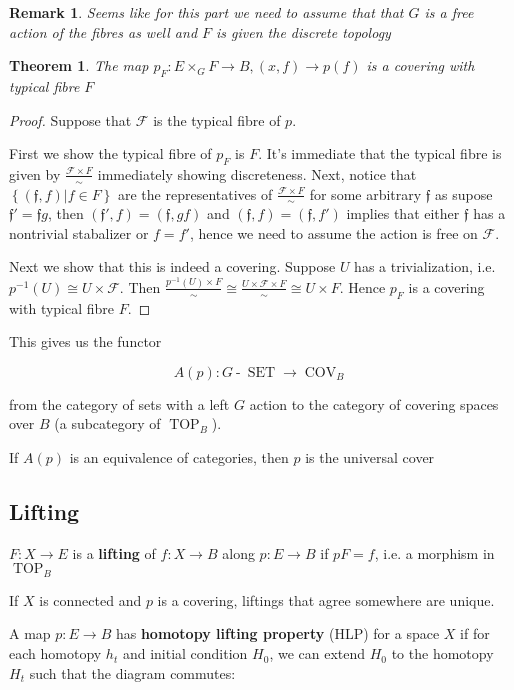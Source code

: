 \documentclass[12pt]{article}
\newtheorem*{thm*}{Theorem}
\newtheorem*{rmk}{Remark}
\newcommand{\mc}{\mathcal}
\newcommand{\mfk}{\mathfrak}
\DeclareMathOperator{\hyp}{-}
\DeclareMathOperator{\SET}{SET}
\DeclareMathOperator{\TOP}{TOP}
\DeclareMathOperator{\COV}{COV}
\begin{document}
\begin{rmk}
    Seems like for this part we need to assume that that $G$ is a free action of the fibres as well and $F$ is given the discrete topology
\end{rmk}

\begin{thm*}
    The map $p_F:E\times_GF\to B,(x,f)\to p(f)$ is a covering with typical fibre $F$
\end{thm*}

\begin{proof}
    Suppose that $\mc F$ is the typical fibre of $p$.

    First we show the typical fibre of $p_F$ is $F$. It's immediate that the typical fibre is given by $\frac{\mc F\times F}{\sim}$ immediately showing discreteness. Next, notice that $\left\{\left(\mfk f,f\right)|f\in F\right\}$ are the representatives of $\frac{\mc F\times F}{\sim}$ for some arbitrary $\mfk f$ as supose $\mfk f'=\mfk fg$, then $\left(\mfk f',f\right)=\left(\mfk f,gf\right)$ and $\left(\mfk f,f\right)=\left(\mfk f,f'\right)$ implies that either $\mfk f$ has a nontrivial stabalizer or $f=f'$, hence we need to assume the action is free on $\mc F$.

    Next we show that this is indeed a covering. Suppose $U$ has a trivialization, i.e. $p^{-1}(U)\cong U\times\mc F$. Then $\frac{p^{-1}(U)\times F}{\sim}\cong\frac{U\times\mc F\times F}{\sim}\cong U\times F$. Hence $p_F$ is a covering with typical fibre $F$.
\end{proof}

This gives us the functor

\[A(p):G\hyp\SET\to\COV_B\]

from the category of sets with a left $G$ action to the category of covering spaces over $B$ (a subcategory of $\TOP_B$).

If $A(p)$ is an equivalence of categories, then $p$ is the universal cover

\subsection{Lifting}

$F:X\to E$ is a \textbf{lifting} of $f:X\to B$ along $p:E\to B$ if $pF=f$, i.e. a morphism in $\TOP_B$

If $X$ is connected and $p$ is a covering, liftings that agree somewhere are unique.

A map $p:E\to B$ has \textbf{homotopy lifting property} (HLP) for a space $X$ if for each homotopy $h_t$ and initial condition $H_0$, we can extend $H_0$ to the homotopy $H_t$ such that the diagram commutes:
\end{document}
